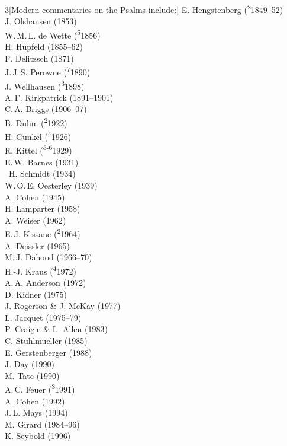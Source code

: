 \documentclass[titlepage]{article}
\begin{document}
\begin{multicols}{3}[Modern commentaries on the Psalms include:]%
\footnotesize\noindent
E. Hengstenberg (\textsuperscript{2}1849--52)\\
J. Olshausen (1853)\\
W.\,M.\,L. de Wette (\textsuperscript{5}1856)\\
H. Hupfeld (1855--62)\\
F. Delitzsch (1871)\\
J.\,J.\,S. Perowne (\textsuperscript{7}1890)\\
J. Wellhausen (\textsuperscript{3}1898)\\
A.\,F. Kirkpatrick (1891--1901)\\
C.\,A. Briggs (1906--07)\\
B. Duhm (\textsuperscript{2}1922)\\
H. Gunkel (\textsuperscript{4}1926)\\
R. Kittel (\textsuperscript{5-6}1929)\\
E.\,W. Barnes (1931)\\\
H. Schmidt (1934)\\
W.\,O.\,E. Oesterley (1939)\\
A. Cohen (1945)\\
H. Lamparter (1958)\\
A. Weiser (1962)\\
E.\,J. Kissane (\textsuperscript{2}1964)\\
A. Deissler (1965)\\
M.\,J. Dahood (1966--70)\\
H.-J. Kraus (\textsuperscript{4}1972)\\
A.\,A. Anderson (1972)\\
D. Kidner (1975)\\
J. Rogerson \& J. McKay (1977)\\
L. Jacquet (1975--79)\\
P. Craigie \& L. Allen (1983)\\
C. Stuhlmueller (1985)\\
E. Gerstenberger (1988)\\
J. Day (1990)\\
M. Tate (1990)\\
A.\,C. Feuer (\textsuperscript{3}1991)\\
A. Cohen (1992)\\
J.\,L. Mays (1994)\\
M. Girard (1984--96)\\
K. Seybold (1996)\\

\end{multicols}
\end{document}
